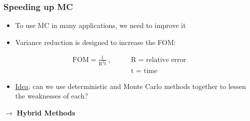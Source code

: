 \documentclass[xcolor=x11names,compress, handout]{beamer}
\renewcommand{\(}{\begin{columns}}
\renewcommand{\)}{\end{columns}}
\newcommand{\<}[1]{\begin{column}{#1}}
\renewcommand{\>}{\end{column}}
\begin{document}
\begin{frame}[fragile]
  \frametitle{Speeding up MC}
  \begin{itemize}
  	\item To use MC in many applications, we need to \alert{improve} it
	\item Variance reduction is designed to increase the FOM:
  \end{itemize}
\begin{align}
\text{FOM} = \frac{1}{\text{R}^2\text{t}}\:,
 \qquad & \text{R = relative error} \nonumber \\ 
& \text{t = time} \nonumber 
\end{align}
  \begin{itemize}
  \pause
  	\item \underline{Idea}: can we use deterministic and Monte Carlo methods together to lessen the weaknesses of each?
  \end{itemize}
  \pause
  $\rightarrow$ \textbf{Hybrid Methods}

\end{frame}
\end{document}
